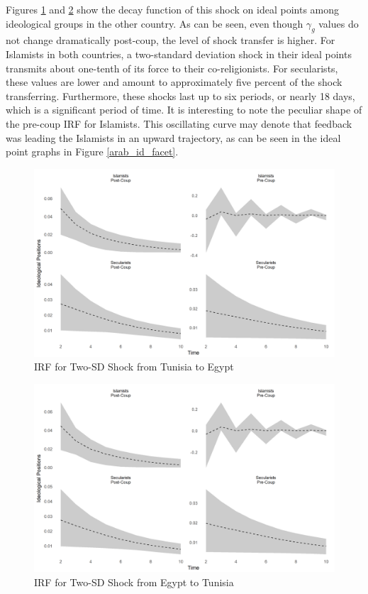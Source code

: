 \documentclass[12pt]{article}
\begin{document}
Figures \ref{irf_tunis} and \ref{irf_egypt} show the decay function of this shock on ideal points among ideological groups in the other country. As can be seen, even though $\gamma_g$ values do not change dramatically post-coup, the level of shock transfer is higher. For Islamists in both countries, a two-standard deviation shock in their ideal points transmits about one-tenth of its force to their co-religionists. For secularists, these values are lower and amount to approximately five percent of the shock transferring. Furthermore, these shocks last up to six periods, or nearly 18 days, which is a significant period of time. It is interesting to note the peculiar shape of the pre-coup IRF for Islamists. This oscillating curve may denote that feedback was leading the Islamists in an upward trajectory, as can be seen in the ideal point graphs in Figure \ref{arab_id_facet}.
 \begin{figure}[!h]
	\centering
	\caption{IRF for Two-SD Shock from Tunisia to Egypt}\label{irf_tunis}
	\centering
	\includegraphics[width=.9\linewidth]{irf_tunisia}
\end{figure}
 \begin{figure}[!h]
	\centering
	\caption{IRF for Two-SD Shock from Egypt to Tunisia}\label{irf_egypt}
	\centering
	\includegraphics[width=.9\linewidth]{irf_egypt}
\end{figure}
\end{document}
